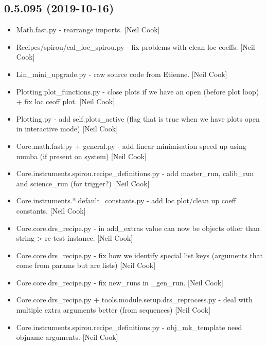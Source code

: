 \documentclass[a4paper,10pt,english]{report}
\begin{document}
\subsection{0.5.095 (2019-10-16)}
\label{\detokenize{misc/changelog:id46}}\begin{itemize}
\item {} 
Math.fast.py - rearrange imports. {[}Neil Cook{]}

\item {} 
Recipes/spirou/cal\_loc\_spirou.py - fix problems with clean loc coeffs.
{[}Neil Cook{]}

\item {} 
Lin\_mini\_upgrade.py - raw source code from Etienne. {[}Neil Cook{]}

\item {} 
Plotting.plot\_functions.py - close plots if we have an open (before
plot loop) + fix loc ceoff plot. {[}Neil Cook{]}

\item {} 
Plotting.py - add self.plots\_active (flag that is true when we have
plots open in interactive mode) {[}Neil Cook{]}

\item {} 
Core.math.fast.py + general.py - add linear minimisation speed up
using numba (if present on system) {[}Neil Cook{]}

\item {} 
Core.instruments.spirou.recipe\_definitions.py - add master\_run,
calib\_run and science\_run (for trigger?) {[}Neil Cook{]}

\item {} 
Core.instruments.*.default\_constants.py - add loc plot/clean up coeff
constants. {[}Neil Cook{]}

\item {} 
Core.core.drs\_recipe.py - in add\_extras value can now be objects other
than string \textendash{}\textgreater{} re-test instance. {[}Neil Cook{]}

\item {} 
Core.core.drs\_recipe.py - fix how we identify special list keys
(arguments that come from params but are lists) {[}Neil Cook{]}

\item {} 
Core.core.drs\_recipe.py - fix new\_runs in \_gen\_run. {[}Neil Cook{]}

\item {} 
Core.core.drs\_recipe.py + tools.module.setup.drs\_reprocess.py - deal
with multiple extra arguments better (from sequences) {[}Neil Cook{]}

\item {} 
Core.instruments.spirou.recipe\_definitions.py - obj\_mk\_template need
objname arguments. {[}Neil Cook{]}

\end{itemize}
\end{document}
